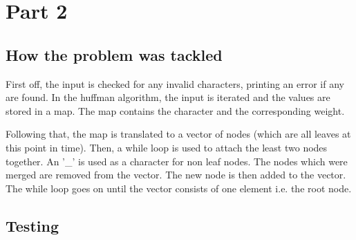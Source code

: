 \documentclass[a4paper, 12pt]{article}
\begin{document}
\section{Part 2}
\subsection{How the problem was tackled}
First off, the input is checked for any invalid characters, printing an error if any are found.
In the huffman algorithm, the input is iterated and the values are stored in a map. The map contains the character
and the corresponding weight.

Following that, the map is translated to a vector of nodes (which are all leaves at this point in time).
Then, a while loop is used to attach the least two nodes together. An '\_' is used as a character for non leaf nodes.
The nodes which were merged are removed from the vector. The new node is then added to the vector. The while loop 
goes on until the vector consists of one element i.e. the root node.

\subsection{Testing}
\end{document}
